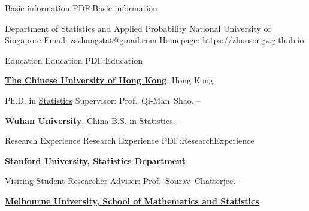 \documentclass[letterpaper,MMMyyyy,nonstopmode]{simpleresumecv}
\newcommand{\CVAuthor}{Dr. Zhuo-Song Zhang}
\newcommand{\CVWebpage}{https://zhuosongz.github.io}
\begin{document}


\Title{\CVAuthor}


\begin{Body}



{Basic information}
{PDF:Basic information}

\BulletItem Department of Statistics and Applied Probability
\BulletItem National University of Singapore
\BulletItem Email: \href{mailto:zszhang.stat@gmail.com}
{zszhangstat@gmail.com}
\BulletItem Homepage: \href{\CVWebpage}\CVWebpage


\Section
{Education}
{Education}
{PDF:Education}

\Entry
\href{http://www.cuhk.edu.hk}
{\textbf{The Chinese University of Hong Kong}}, Hong Kong

\Gap
\BulletItem
Ph.D. in
\href{http://www.sta.cuhk.edu.hk}
{Statistics}
\SubBulletItem
Supervisor:
Prof.~Qi-Man~Shao.
\hfill
{} -- 
\begin{Detail}
\end{Detail}

\Entry
\href{http://www.whu.edu.cn}
{\textbf{Wuhan University}}, China
\Gap
\BulletItem
B.S. in Statistics.
\hfill
{} -- 




\Section
{Research Experience}
{Research Experience}
{PDF:ResearchExperience}

\Entry
\href{http://www.stanford.edu}
{\textbf{Stanford University,  Statistics Department}}

\Gap
\BulletItem
Visiting Student Researcher
\SubBulletItem
Adviser:
Prof.~Sourav~Chatterjee.
\hfill
{} --
\begin{Detail}
\end{Detail}
\Entry
\href{http://www.unimelb.edu.au}
{\textbf{Melbourne University,  School of Mathematics and Statistics}}


\end{Body}
\end{document}
